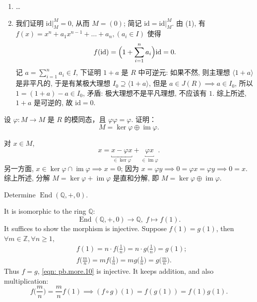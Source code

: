 \begin{vain}
\begin{enumerate}[label=(\arabic*)]
    \item \dots
    \item 我们证明 $\left.{\mathrm{id}}\right|_{M}^{M}=0$, 从而 $M=(0)$; 简记 $\mathrm{id}=\left.{\mathrm{id}}\right|_{M}^{M}$. 由 (1), 有 $f(x) = x^n + a_1 x^{n-1} + \dots + a_n,(a_{i}\in I)$ 使得  
            \[
                f(\mathrm{id})=\Bigl(1+\sum_{i=1}^{n}a_{i}\Bigr)\mathrm{id}=0.
            \]
        记 $a=\sum_{i=1}^{n}a_{i}\in I$, 下证明 $1+a$ 是 $R$ 中可逆元: 如果不然, 则主理想 $ \langle 1+a \rangle  $ 是非平凡的, 
        于是有某极大理想 $I_{0}\supseteq \langle 1+a \rangle$, 但是 $a\in J(R)\implies a\in I_{0}$, 所以 $1=(1+a)-a\in I_{0}$, 
        矛盾: 极大理想不是平凡理想, 不应该有 $1$. 综上所述, $1+a$ 是可逆的, 故 $\mathrm{id}=0$.
    
\end{enumerate}\end{vain}

\setcounter{pb}{6}
\begin{problem}
    设 $ \varphi: M \to M $ 是 $ R $ 的模同态，且 $ \varphi \varphi = \varphi $. 
    证明：
    \[
        M = \ker \varphi \oplus \operatorname{im} \varphi.
    \]
\end{problem}

\begin{solution}
    对 $x\in M$, 
        \[
            x=\underbracket{x-\varphi x}_{\in\ker \varphi}+\underbracket{\varphi x}_{\in \operatorname{im}\varphi}.
        \]
    另一方面, $x\in\ker\varphi\cap \operatorname{im}\varphi\implies x=0$; 因为 $x=\varphi y\implies 0=\varphi x=\varphi y\implies 0=x$. 
    综上所述, 分解 $M=\ker\varphi+\operatorname{im}\varphi$ 是直和分解, 即 $M=\ker\varphi\oplus\operatorname{im}\varphi$. 
\end{solution}
    
\setcounter{pb}{10}
\begin{problem}
    Determine $\operatorname{End}(\mathbb{Q},+,0)$.
\end{problem}

\begin{solution}
    It is isomorphic to the ring $\mathbb{Q}$:
        \begin{equation}
            \label{eqn: pb.more.10}
            \operatorname{End}(\mathbb{Q},+,0) \to \mathbb{Q},\; f\mapsto f(1). 
        \end{equation}
    It suffices to show the morphism is injective.  Suppose $f(1)=g(1)$, then $\forall m\in\mathbb{Z},\forall n\geq1  $, 
        \[
            \begin{split}
                & f(1)=n\cdot f\Big(\frac{1}{n}\Big)=n\cdot g\Big(\frac{1}{n}\Big)=g(1);\\
                & f\Big(\frac{m}{n}\Big)=m f\Big(\frac{1}{n}\Big)=m g\Big(\frac{1}{n}\Big)=g\Big(\frac{m}{n}\Big).
            \end{split}
        \]
    Thus $f=g$, \eqref{eqn: pb.more.10} is injective. 
    It keeps addition, and also multiplication:
        \[
            f\Big(\frac{m}{n}\Big)=\frac{m}{n}f(1)\implies(f\circ g)(1)=f( g(1) )=f(1) g(1).
        \]
\end{solution}

